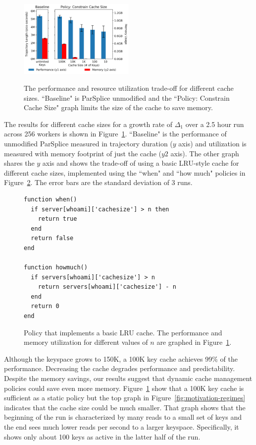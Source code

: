 \begin{figure}[t]
  \noindent\includegraphics[width=0.5\textwidth]{figures/methodology-tradeoff.png}\\
  \caption{The performance and resource utilization trade-off for different
  cache sizes. ``Baseline" is
  ParSplice unmodified and the ``Policy: Constrain Cache Size" graph limits the
  size of the cache to save memory.  \label{fig:methodology-tradeoff}}
\end{figure}

The results for different cache sizes for a growth rate of \(\Delta_1\) over a
2.5 hour run across 256 workers is shown in
Figure~\ref{fig:methodology-tradeoff}.  ``Baseline" is the performance of
unmodified ParSplice  measured in trajectory duration (\(y\) axis) and
utilization is measured with memory footprint of just the cache (\(y2\) axis).
The other graph shares the \(y\) axis and shows the trade-off of using a basic
LRU-style cache for different cache sizes, implemented using the ``when" and
``how much" policies in Figure~\ref{src:lru}.  The error bars are the standard
deviation of 3 runs. 

\begin{figure}[t]
\footnotesize
\centering
\begin{verbatim}
function when()
  if server[whoami]['cachesize'] > n then
    return true
  end
  return false
end

function howmuch()
  if servers[whoami]['cachesize'] > n
    return servers[whoami]['cachesize'] - n
  end
  return 0
end
\end{verbatim}
\caption{Policy that implements a basic LRU cache. The performance and memory
utilization for different values of \(n\) are graphed in
Figure~\ref{fig:methodology-tradeoff}.
\label{src:lru}}
\end{figure}

Although the keyspace grows to 150K, a 100K key cache achieves 99\% of the
performance. Decreasing the cache degrades performance and predictability.
Despite the memory savings, our results suggest that dynamic cache management
policies could save even more memory.  Figure~\ref{fig:methodology-tradeoff}
show that a 100K key cache is sufficient as a static policy but the top graph
in Figure~\ref{fig:motivation-regimes} indicates that the cache size could be
much smaller. That graph shows that the beginning of the run is characterized
by many reads to a small set of keys and the end sees much lower reads per
second to a larger keyspace. Specifically, it shows only about 100 keys as
active in the latter half of the run.


